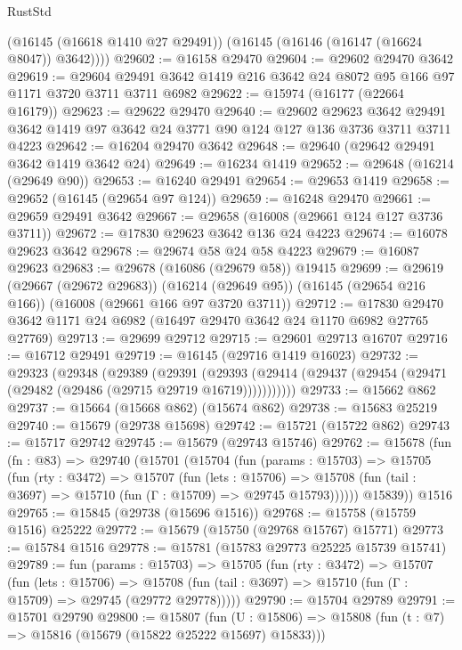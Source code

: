 \begin{lexlean}{RustStd}
\begin{coremodule}
        (@16145 (@16618 @1410 @27 @29491))
        (@16145 (@16146 (@16147 (@16624 @8047)) @3642))))
@29602 := @16158 @29470
@29604 := @29602 @29470 @3642
@29619 := @29604 @29491 @3642 @1419 @216 @3642 @24 @8072 @95 @166 @97 @1171 @3720 @3711 @3711 @6982
@29622 := @15974 (@16177 (@22664 @16179))
@29623 := @29622 @29470
@29640 := @29602
    @29623
    @3642
    @29491
    @3642
    @1419
    @97
    @3642
    @24
    @3771
    @90
    @124
    @127
    @136
    @3736
    @3711
    @3711
    @4223
@29642 := @16204 @29470 @3642
@29648 := @29640 (@29642 @29491 @3642 @1419 @3642 @24)
@29649 := @16234 @1419
@29652 := @29648 (@16214 (@29649 @90))
@29653 := @16240 @29491
@29654 := @29653 @1419
@29658 := @29652 (@16145 (@29654 @97 @124))
@29659 := @16248 @29470
@29661 := @29659 @29491 @3642
@29667 := @29658 (@16008 (@29661 @124 @127 @3736 @3711))
@29672 := @17830 @29623 @3642 @136 @24 @4223
@29674 := @16078 @29623 @3642
@29678 := @29674 @58 @24 @58 @4223
@29679 := @16087 @29623
@29683 := @29678 (@16086 (@29679 @58)) @19415
@29699 := @29619
    (@29667 (@29672 @29683))
    (@16214 (@29649 @95))
    (@16145 (@29654 @216 @166))
    (@16008 (@29661 @166 @97 @3720 @3711))
@29712 := @17830 @29470 @3642 @1171 @24 @6982 (@16497 @29470 @3642 @24 @1170 @6982 @27765 @27769)
@29713 := @29699 @29712
@29715 := @29601 @29713 @16707
@29716 := @16712 @29491
@29719 := @16145 (@29716 @1419 @16023)
@29732 := @29323
    (@29348
      (@29389
        (@29391
          (@29393 (@29414 (@29437 (@29454 (@29471 (@29482 (@29486 (@29715 @29719 @16719)))))))))))
@29733 := @15662 @862
@29737 := @15664 (@15668 @862) (@15674 @862)
@29738 := @15683 @25219
@29740 := @15679 (@29738 @15698)
@29742 := @15721 (@15722 @862)
@29743 := @15717 @29742
@29745 := @15679 (@29743 @15746)
@29762 := @15678
    (fun (fn : @83) =>
    @29740
      (@15701
        (@15704
          (fun (params : @15703) =>
          @15705
            (fun (rty : @3472) =>
            @15707
              (fun (lets : @15706) =>
              @15708 (fun (tail : @3697) => @15710 (fun (Γ : @15709) => @29745 @15793))))))
        @15839))
    @1516
@29765 := @15845 (@29738 (@15696 @1516))
@29768 := @15758 (@15759 @1516) @25222
@29772 := @15679 (@15750 (@29768 @15767) @15771)
@29773 := @15784 @1516
@29778 := @15781 (@15783 @29773 @25225 @15739 @15741)
@29789 := fun (params : @15703) =>
  @15705
    (fun (rty : @3472) =>
    @15707
      (fun (lets : @15706) =>
      @15708 (fun (tail : @3697) => @15710 (fun (Γ : @15709) => @29745 (@29772 @29778)))))
@29790 := @15704 @29789
@29791 := @15701 @29790
@29800 := @15807
    (fun (U : @15806) => @15808 (fun (t : @7) => @15816 (@15679 (@15822 @25222 @15697) @15833)))

\end{coremodule}
\end{lexlean}
